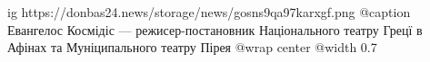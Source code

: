  
 
 
 
 

\ifcmt
  ig https://donbas24.news/storage/news/gosns9qa97karxgf.png
  @caption Евангелос Космідіс — режисер-постановник Національного театру Грецї в Афінах та Муніципального театру Пірея
  @wrap center
  @width 0.7
\fi
